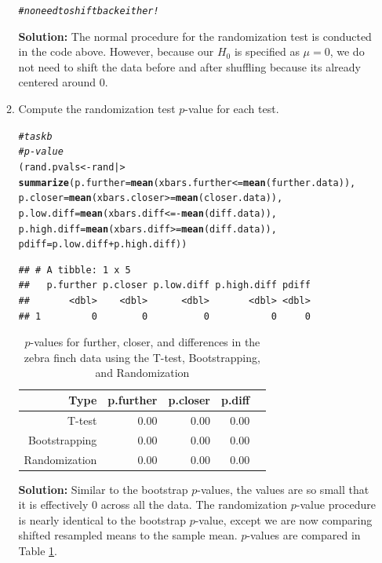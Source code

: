 \documentclass{article}\usepackage[]{graphicx}\usepackage[]{xcolor}
\makeatletter
\newcommand{\hlcom}[1]{\textcolor[rgb]{0.678,0.584,0.686}{\textit{#1}}}%
\newcommand{\hlopt}[1]{\textcolor[rgb]{0,0,0}{#1}}%
\newcommand{\hldef}[1]{\textcolor[rgb]{0.345,0.345,0.345}{#1}}%
\newcommand{\hlkwb}[1]{\textcolor[rgb]{0.69,0.353,0.396}{#1}}%
\newcommand{\hlkwc}[1]{\textcolor[rgb]{0.333,0.667,0.333}{#1}}%
\newcommand{\hlkwd}[1]{\textcolor[rgb]{0.737,0.353,0.396}{\textbf{#1}}}%
\newenvironment{kframe}{%
 \def\at@end@of@kframe{}%
 \ifinner\ifhmode%
  \def\at@end@of@kframe{\end{minipage}}%
  \begin{minipage}{\columnwidth}%
 \fi\fi%
 \def\FrameCommand##1{\hskip\@totalleftmargin \hskip-\fboxsep
 \colorbox{shadecolor}{##1}\hskip-\fboxsep
     \hskip-\linewidth \hskip-\@totalleftmargin \hskip\columnwidth}%
 \MakeFramed {\advance\hsize-\width
   \@totalleftmargin\z@ \linewidth\hsize
   \@setminipage}}%
 {\par\unskip\endMakeFramed%
 \at@end@of@kframe}
\newenvironment{knitrout}{}{} %
\makeatother
\begin{document}
\begin{enumerate}
\begin{enumerate}
\begin{knitrout}
\begin{kframe}
\begin{alltt}
\hlcom{# no need to shift back either!}
\end{alltt}
\end{kframe}
\end{knitrout}
\textbf{Solution:} The normal procedure for the randomization test is conducted in the code above. However, because our $H_0$ is specified as $\mu = 0$, we do not need to shift the data before and after shuffling because its already centered around $0$. 
  \item Compute the randomization test $p$-value for each test. \\
\begin{knitrout}
\color{fgcolor}\begin{kframe}
\begin{alltt}
\hlcom{# task b}
\hlcom{# p-value }
\hldef{(rand.pvals} \hlkwb{<-} \hldef{rand |>}
\hlkwd{summarize}\hldef{(}\hlkwc{p.further} \hldef{=} \hlkwd{mean}\hldef{(xbars.further} \hlopt{<=} \hlkwd{mean}\hldef{(further.data)),}
          \hlkwc{p.closer} \hldef{=} \hlkwd{mean}\hldef{(xbars.closer} \hlopt{>=} \hlkwd{mean}\hldef{(closer.data)),}
          \hlkwc{p.low.diff} \hldef{=} \hlkwd{mean}\hldef{(xbars.diff} \hlopt{<= -}\hlkwd{mean}\hldef{(diff.data)),}
          \hlkwc{p.high.diff} \hldef{=} \hlkwd{mean}\hldef{(xbars.diff} \hlopt{>=} \hlkwd{mean}\hldef{(diff.data)),}
          \hlkwc{pdiff} \hldef{= p.low.diff} \hlopt{+} \hldef{p.high.diff))}
\end{alltt}
\begin{verbatim}
## # A tibble: 1 x 5
##   p.further p.closer p.low.diff p.high.diff pdiff
##       <dbl>    <dbl>      <dbl>       <dbl> <dbl>
## 1         0        0          0           0     0
\end{verbatim}
\end{kframe}
\end{knitrout}
\begin{table}[ht]
\centering
\begin{tabular}{rrrrr}
  \hline
 Type & p.further & p.closer & p.diff \\ 
  \hline
T-test & 0.00 & 0.00 & 0.00 \\ 
  Bootstrapping & 0.00 & 0.00 & 0.00 \\
  Randomization & 0.00 & 0.00 & 0.00 \\
   \hline
\end{tabular}
\caption{$p$-values for further, closer, and differences in the zebra finch data using the T-test, Bootstrapping, and Randomization}
\label{table3}
\end{table}
  \textbf{Solution:} Similar to the bootstrap $p$-values, the values are so small that it is effectively $0$ across all the data. The randomization $p$-value procedure is nearly identical to the bootstrap $p$-value, except we are now comparing shifted resampled means to the sample mean. $p$-values are compared in Table \ref{table3}.
  

\end{enumerate}
\end{enumerate}
\end{document}
